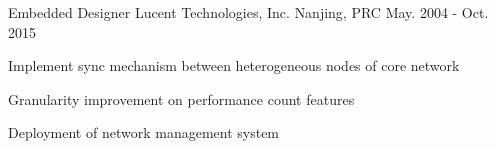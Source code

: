 \begin{cventries}
  \cventry
    {Embedded Designer} %
    {Lucent Technologies, Inc.} %
    {Nanjing, PRC} %
    {May. 2004 - Oct. 2015} %
    {
      \begin{cvitems} %
        \item {Implement sync mechanism between heterogeneous nodes of core network}
        \item {Granularity improvement on performance count features}
        \item {Deployment of network management system}
      \end{cvitems}
    }

\end{cventries}
